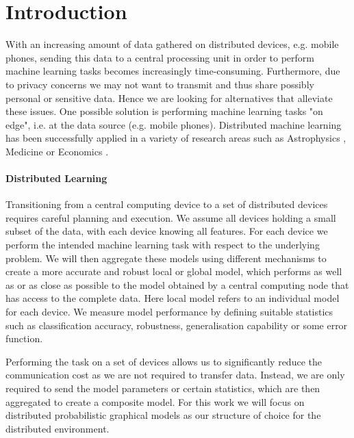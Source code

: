   \section{Introduction}
  With an increasing amount of data gathered on distributed devices, e.g. mobile phones, sending this data to a central processing unit in order to perform machine learning tasks becomes increasingly time-consuming.
  Furthermore, due to privacy concerns we may not want to transmit and thus share possibly personal or sensitive data.
  Hence we are looking for alternatives that alleviate these issues.
  One possible solution is performing machine learning tasks "on edge", i.e. at the data source (e.g. mobile phones).
  Distributed machine learning has been successfully applied in a variety of research areas such as Astrophysics \cite{panousopoulou2017distributed}, Medicine \cite{deist2017infrastructure} or Economics \cite{kreitlein2015green}.

  \paragraph{Distributed Learning}

  Transitioning from a central computing device to a set of distributed devices requires careful planning and execution.
  We assume all devices holding a small subset of the data, with each device knowing all features.
  For each device we perform the intended machine learning task with respect to the underlying problem.
  We will then aggregate these models using different mechanisms to create a more accurate and robust local or global model, which performs as well as or as close as possible to the model obtained by a central computing node that has access to the complete data.
  Here local model refers to an individual model for each device.
  We measure model performance by defining suitable statistics such as classification accuracy, robustness, generalisation capability or some error function.

  Performing the task on a set of devices allows us to significantly reduce the communication cost as we are not required to transfer data.
  Instead, we are only required to send the model parameters or certain statistics, which are then aggregated to create a composite model.
  For this work we will focus on distributed probabilistic graphical models as our structure of choice for the distributed environment.
